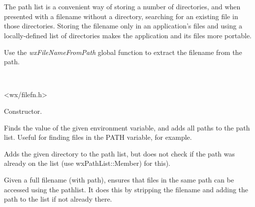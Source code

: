 \section{}\label{wxpathlist}

The path list is a convenient way of storing a number of directories, and
when presented with a filename without a directory, searching for an existing file
in those directories.  Storing the filename only in an application's files and
using a locally-defined list of directories makes the application and its files more
portable.

Use the {\it wxFileNameFromPath} global function to extract the filename
from the path.


\\


<wx/filefn.h>






Constructor.



Finds the value of the given environment variable, and adds all paths
to the path list. Useful for finding files in the PATH variable, for
example.



Adds the given directory to the path list, but does not
check if the path was already on the list (use wxPathList::Member)
for this).



Given a full filename (with path), ensures that files in the same path
can be accessed using the pathlist. It does this by stripping the
filename and adding the path to the list if not already there.

